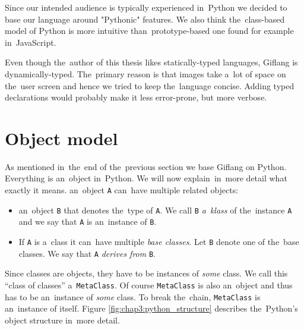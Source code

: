 Since our intended audience is typically experienced in~Python we decided to base our language around "Pythonic" features. We also think
the~class-based model of Python is more intuitive than~prototype-based one found for example in~JavaScript.

Even though the~author of this thesis likes statically-typed languages, Giflang is dynamically-typed. The~primary reason is that images take a~lot of
space on the~user screen and hence we tried to keep the~language concise. Adding typed declarations would probably make it less error-prone, but more verbose.

\section{Object model}
\label{chap3:object_model}
As mentioned in~the~end of the~previous section we base Giflang on Python. Everything is an~object in~Python. We will now explain~in~more detail what exactly
it means. an~object \texttt{A} can~have multiple related objects:
\begin{itemize}
    \item an~object \texttt{B} that denotes the~type of \texttt{A}. We call \texttt{B} \emph{a~klass} of the~instance \texttt{A} and we say that \texttt{A}
    is an~instance of \texttt{B}.
    \item If \texttt{A} is a~class it can~have multiple \emph{base classes}. Let \texttt{B} denote one of the~base classes. We say that \texttt{A}
    \emph{derives from} \texttt{B}. 
\end{itemize}

Since classes are objects, they have to be instances of \emph{some} class. We call this ``class of classes'' a~\texttt{MetaClass}. Of course
\texttt{MetaClass} is also an~object and thus has to be an~instance of \emph{some} class. To break the~chain, \texttt{MetaClass} is an~instance of itself.
Figure \ref{fig:chap3:python_structure} describes the~Python's object structure in~more detail.

